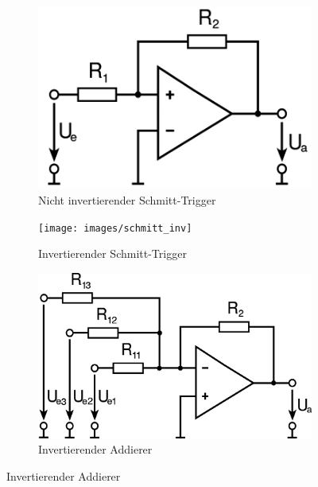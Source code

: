 	\begin{figure}[h]
		\begin{subfigure}{0.25\textwidth}
		\includegraphics[width=\textwidth]{images/schmitt_noninv}
		\caption{Nicht invertierender Schmitt-Trigger}
		\end{subfigure}
		\begin{subfigure}{0.25\textwidth}
		\texttt{[image: images/schmitt\_inv]}
		\caption{Invertierender Schmitt-Trigger}
		\end{subfigure}
		\begin{subfigure}{0.25\textwidth}
		\includegraphics[width=\textwidth]{images/Inverting_Adder}
		\caption{Invertierender Addierer}
		\end{subfigure}
	\end{figure}
